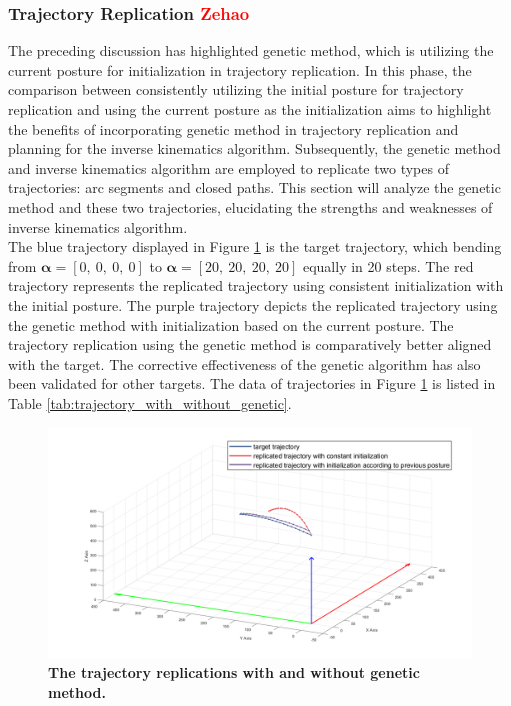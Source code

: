 \subsubsection{Trajectory Replication \textcolor{red}{Zehao}}
The preceding discussion has highlighted genetic method, which is utilizing the current posture for 
initialization in trajectory replication. In this phase, the comparison between consistently utilizing the 
initial posture for trajectory replication and using the current posture as the initialization aims to 
highlight the benefits of incorporating genetic method in trajectory replication and planning for the inverse 
kinematics algorithm. Subsequently, the genetic method and inverse kinematics algorithm are employed to 
replicate two types of trajectories: arc segments and closed paths. This section will analyze the genetic 
method and these two trajectories, elucidating the strengths and weaknesses of inverse kinematics algorithm. \\
The blue trajectory displayed in Figure \ref{fig:genetic_approach} is the target trajectory, which bending from 
$\boldsymbol{\alpha} = [0,\ 0,\ 0,\ 0]$ to $\boldsymbol{\alpha} = [20,\ 20,\ 20,\ 20]$ equally in 20 steps. 
The red trajectory represents the replicated trajectory using consistent initialization with the initial 
posture. The purple trajectory depicts the replicated trajectory using the genetic method with initialization 
based on the current posture. The trajectory replication using the genetic method is comparatively better 
aligned with the target. The corrective effectiveness of the genetic algorithm has also been validated for 
other targets. The data of trajectories in Figure \ref{fig:genetic_approach} is listed in Table 
\ref{tab:trajectory_with_without_genetic}.
\begin{figure}[H] %
    \centering 
    \captionsetup{labelsep=colon}
    \includegraphics[width=1.0\textwidth]{Image/Result/trajectory_replication_diff_initialization.png} 
    \caption[The trajectory replications with and without genetic method]
    {\centering \textbf{The trajectory replications with and without genetic method.}}
    \label{fig:genetic_approach}
\end{figure}
